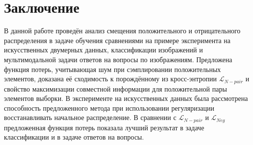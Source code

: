 \documentclass[a4paper, 14pt]{article}
\begin{document}
\newpage
\section{Заключение}
В данной работе проведён анализ смещения положительного и отрицательного распределения в задаче обучения сравнениями на примере эксперимента на искусственных двумерных данных, классификации изображений и мультимодальной задачи ответов на вопросы по изображениям. Предложена функция потерь, учитывающая шум при сэмплировании положительных элементов, доказана её сходимость к порождённому из кросс-энтропии $\mathcal{L}_{N-pair}$ и свойство максимизации совместной информации для положительной пары элементов выборки. В эксперименте на искусственных данных была рассмотрена способность предложенного метода при использовании регуляризации восстанавливать начальное распределение. В сравнении с $\mathcal{L}_{N-pair}$ и $\mathcal{L}_{Neg}$ предложенная функция потерь показала лучший результат в задаче классификации и в задаче ответов на вопросы.

\newpage


\end{document}
